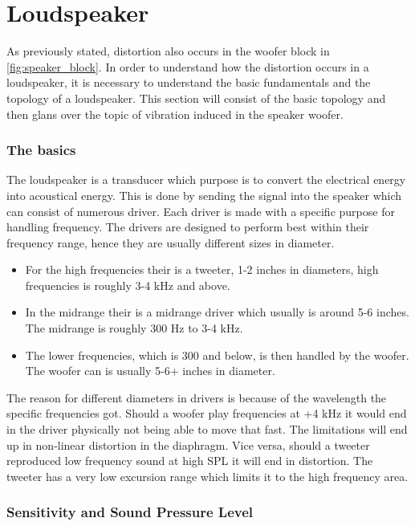 \section{Loudspeaker}

As previously stated, distortion also occurs in the woofer block in \autoref{fig:speaker_block}. In order to understand how the distortion occurs in a loudspeaker, it is necessary to understand the basic fundamentals and the topology of a loudspeaker. This section will consist of the basic topology and then glans over the topic of vibration induced in the speaker woofer.

\subsubsection*{The basics}
The loudspeaker is a transducer which purpose is to convert the electrical energy into acoustical energy. This is done by sending the signal into the speaker which can consist of numerous driver. Each driver is made with a specific purpose for handling frequency. The drivers are designed to perform best within their frequency range, hence they are usually different sizes in diameter.
\begin{itemize}
\item[] For the high frequencies their is a tweeter, 1-2 inches in diameters, high frequencies is roughly 3-4 kHz and above.
\item[] In the midrange their is a midrange driver which usually is around 5-6 inches. The midrange is roughly 300 Hz to 3-4 kHz. 
\item[] The lower frequencies, which is 300 and below, is then handled by the woofer. The woofer can is usually 5-6+ inches in diameter.
\end{itemize}
The reason for different diameters in drivers is because of the wavelength the specific frequencies got. Should a woofer play frequencies at +4 kHz it would end in the driver physically not being able to move that fast. The limitations will end up in non-linear distortion in the diaphragm. Vice versa, should a tweeter reproduced low frequency sound at high \gls{SPL} it will end in distortion. The tweeter has a very low excursion range which limits it to the high frequency area.


\subsubsection*{Sensitivity and Sound Pressure Level}

